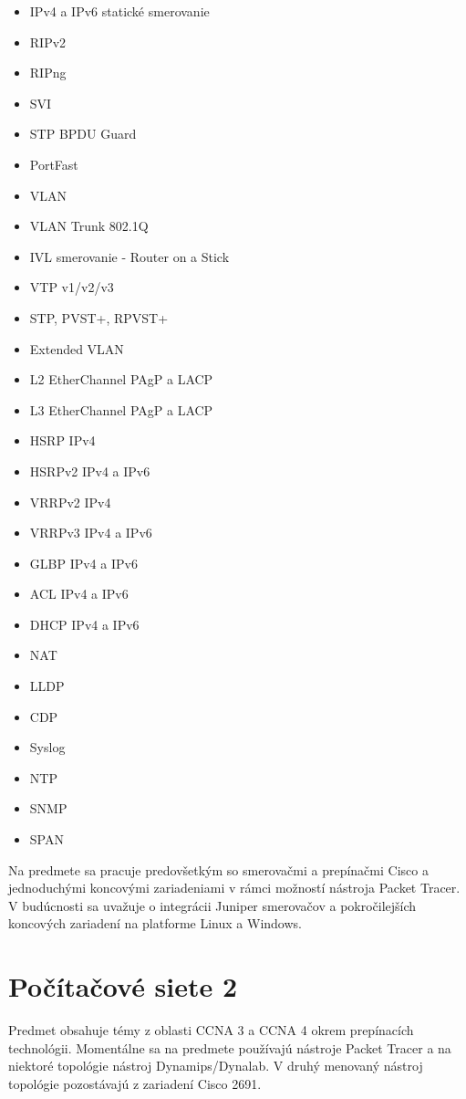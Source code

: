 \begin{itemize}
    \item IPv4 a IPv6 statické smerovanie
    \item RIPv2
    \item RIPng
    \item SVI
    \item STP BPDU Guard
    \item PortFast
    \item VLAN
    \item VLAN Trunk 802.1Q
    \item IVL smerovanie - Router on a Stick
    \item VTP v1/v2/v3
    \item STP, PVST+, RPVST+
    \item Extended VLAN
    \item L2 EtherChannel PAgP a LACP
    \item L3 EtherChannel PAgP a LACP
    \item HSRP IPv4 
    \item HSRPv2 IPv4 a IPv6 
    \item VRRPv2 IPv4 
    \item VRRPv3 IPv4 a IPv6 
    \item GLBP IPv4 a IPv6 
    \item ACL IPv4 a IPv6 
    \item DHCP IPv4 a IPv6 
    \item NAT
    \item LLDP
    \item CDP
    \item Syslog
    \item NTP
    \item SNMP
    \item SPAN
\end{itemize}

Na predmete sa pracuje predovšetkým so smerovačmi a prepínačmi Cisco a jednoduchými koncovými zariadeniami v rámci možností nástroja Packet Tracer. V budúcnosti sa uvažuje o integrácii Juniper smerovačov a pokročilejších koncových zariadení na platforme Linux a Windows.




\section{Počítačové siete 2}

Predmet obsahuje témy z oblasti CCNA 3 a CCNA 4 okrem prepínacích technológii. Momentálne sa na predmete používajú nástroje Packet Tracer a na niektoré topológie nástroj Dynamips/Dynalab. V druhý menovaný nástroj topológie pozostávajú z zariadení Cisco 2691.

